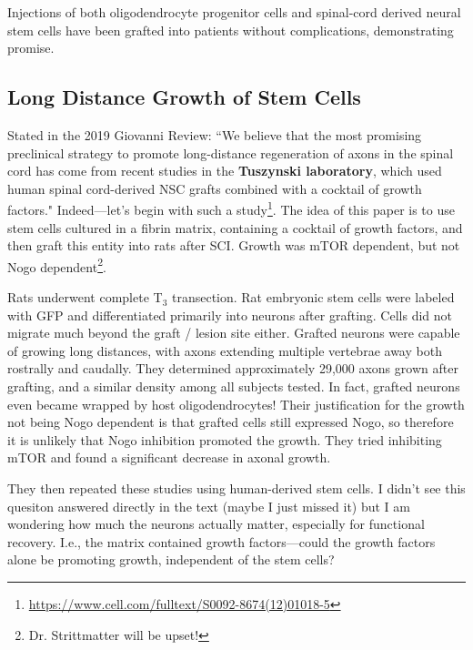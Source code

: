 \documentclass[12pt]{report}
\begin{document}
Injections of both oligodendrocyte progenitor cells and spinal-cord derived neural stem cells have been grafted into patients without complications, demonstrating promise. 



\subsection{Long Distance Growth of Stem Cells}

Stated in the 2019 Giovanni Review: ``We believe that the most promising preclinical strategy to promote long-distance regeneration of axons in the spinal cord has come from recent studies in the \textbf{Tuszynski laboratory}, which used human spinal cord-derived NSC grafts combined with a cocktail of growth factors." Indeed---let's begin with such a study\footnote{\url{https://www.cell.com/fulltext/S0092-8674(12)01018-5}}. The idea of this paper is to use stem cells cultured in a fibrin matrix, containing a cocktail of growth factors, and then graft this entity into rats after SCI. Growth was mTOR dependent, but not Nogo dependent\footnote{Dr. Strittmatter will be upset!}.\newline

Rats underwent complete T$_3$ transection. Rat embryonic stem cells were labeled with GFP and differentiated primarily into neurons after grafting. Cells did not migrate much beyond the graft / lesion site either. Grafted neurons were capable of growing long distances, with axons extending multiple vertebrae away both rostrally and caudally. They determined approximately 29,000 axons grown after grafting, and a similar density among all subjects tested. In fact, grafted neurons even became wrapped by host oligodendrocytes! Their justification for the growth not being Nogo dependent is that grafted cells still expressed Nogo, so therefore it is unlikely that Nogo inhibition promoted the growth. They tried inhibiting mTOR and found a significant decrease in axonal growth.\newline

They then repeated these studies using human-derived stem cells. I didn't see this quesiton answered directly in the text (maybe I just missed it) but I am wondering how much the neurons actually matter, especially for functional recovery. I.e., the matrix contained growth factors---could the growth factors alone be promoting growth, independent of the stem cells?
\end{document}
